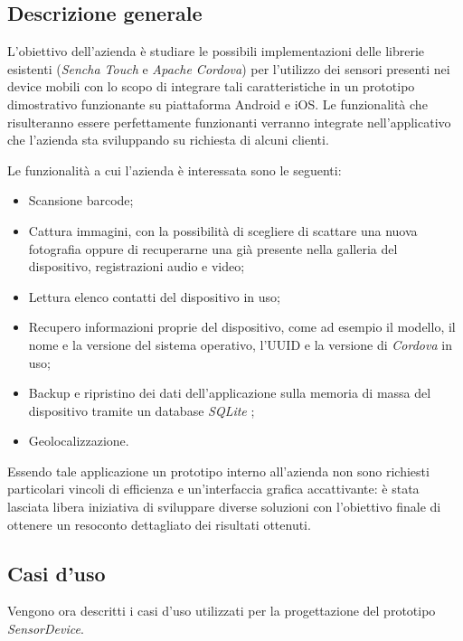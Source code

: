 \subsection{Descrizione generale}
L'obiettivo dell'azienda è studiare le possibili implementazioni delle librerie esistenti (\emph{Sencha Touch} e \emph{Apache Cordova}) per l'utilizzo dei sensori presenti nei device mobili con lo scopo di integrare tali caratteristiche in un prototipo dimostrativo funzionante su piattaforma Android e iOS.
Le funzionalità che risulteranno essere perfettamente funzionanti verranno integrate nell'applicativo che l'azienda sta sviluppando su richiesta di alcuni clienti.

Le funzionalità a cui l'azienda è interessata sono le seguenti:
\begin{itemize}
\item Scansione barcode;
\item Cattura immagini, con la possibilità di scegliere di scattare una nuova fotografia oppure di recuperarne una già presente nella galleria del dispositivo, registrazioni audio e video;
\item Lettura elenco contatti del dispositivo in uso;
\item Recupero informazioni proprie del dispositivo, come ad esempio il modello, il nome e la versione del sistema operativo, l'\ac{UUID} e la versione di \emph{Cordova} in uso;
\item Backup e ripristino dei dati dell'applicazione sulla memoria di massa del dispositivo tramite un database \emph{SQLite} \cite{hipp:sqlite};
\item Geolocalizzazione.
\end{itemize}

Essendo tale applicazione un prototipo interno all'azienda non sono richiesti particolari vincoli di efficienza e un'interfaccia grafica accattivante: è stata lasciata libera iniziativa di sviluppare diverse soluzioni con l'obiettivo finale di ottenere un resoconto dettagliato dei risultati ottenuti.

\subsection{Casi d'uso}
Vengono ora descritti i casi d'uso utilizzati per la progettazione del prototipo \emph{SensorDevice}.

